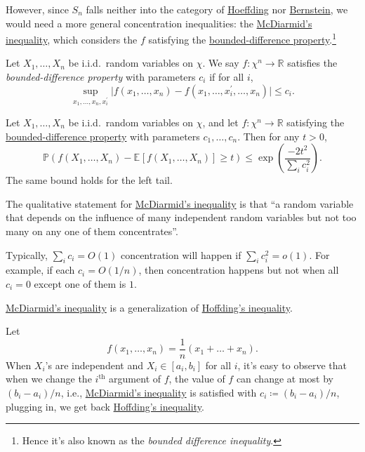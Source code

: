 However, since \(S_n\) falls neither into the category of \hyperref[thm:Hoeffding-inequality]{Hoeffding} nor \hyperref[thm:Bernstein-inequality]{Bernstein}, we would need a more general concentration inequalities: the \hyperref[thm:McDiarmid-inequality]{McDiarmid's inequality}, which considers the \(f\) satisfying the \hyperref[def:bounded-difference-property]{bounded-difference property}.\footnote{Hence it's also known as the \emph{bounded difference inequality}.}

\begin{definition}\label{def:bounded-difference-property}
	Let \(X_1, \dots , X_n\) be i.i.d.\ random variables on \(\chi \). We say \(f\colon \chi ^n \to \mathbb{R} \) satisfies the \emph{bounded-difference property} with parameters \(c_i\) if for all \(i\),
	\[
		\sup _{x_1, \dots , x_n, x_i^{\prime} }\vert f(x_1, \dots , x_n) - f(x_1, \dots , x_i^{\prime} , \dots , x_n) \vert \leq c_i.
	\]
\end{definition}

\begin{theorem}\label{thm:McDiarmid-inequality}
	Let \(X_1, \dots , X_n\) be i.i.d.\ random variables on \(\chi \), and let \(f\colon \chi ^n \to \mathbb{R} \) satisfying the \hyperref[def:bounded-difference-property]{bounded-difference property} with parameters \(c_1, \dots , c_n\). Then for any \(t > 0\),
	\[
		\mathbb{P} (f(X_1, \dots , X_n) - \mathbb{E}_{}\left[f (X_1, \dots , X_n)\right] \geq t) \leq \exp \left( \frac{-2t^2}{\sum_{i} c_i^2} \right).
	\]
	The same bound holds for the left tail.
\end{theorem}

\begin{remark}
	The qualitative statement for \hyperref[thm:McDiarmid-inequality]{McDiarmid's inequality} is that ``a random variable that depends on the influence of many independent random variables but not too many on any one of them concentrates''.
\end{remark}
\begin{explanation}
	Typically, \(\sum_{i} c_i = O(1)\) concentration will happen if \(\sum_{i} c_i^2 = o(1)\). For example, if each \(c_i = O(1 / n)\), then concentration happens but not when all \(c_i = 0\) except one of them is \(1\).
\end{explanation}

\begin{remark}
	\hyperref[thm:McDiarmid-inequality]{McDiarmid's inequality} is a generalization of \hyperref[thm:Hoeffding-inequality]{Hoffding's inequality}.
\end{remark}
\begin{explanation}
	Let
	\[
		f(x_1, \dots , x_n) = \frac{1}{n}(x_1 + \dots + x_n).
	\]
	When \(X_i\)'s are independent and \(X_i \in [a_i, b_i]\) for all \(i\), it's easy to observe that when we change the \(i^{\text{th} }\) argument of \(f\), the value of \(f\) can change at most by \((b_i - a_i) / n\), i.e., \hyperref[thm:McDiarmid-inequality]{McDiarmid's inequality} is satisfied with \(c_i \coloneqq (b_i - a_i) / n\), plugging in, we get back \hyperref[thm:Hoeffding-inequality]{Hoffding's inequality}.
\end{explanation}

